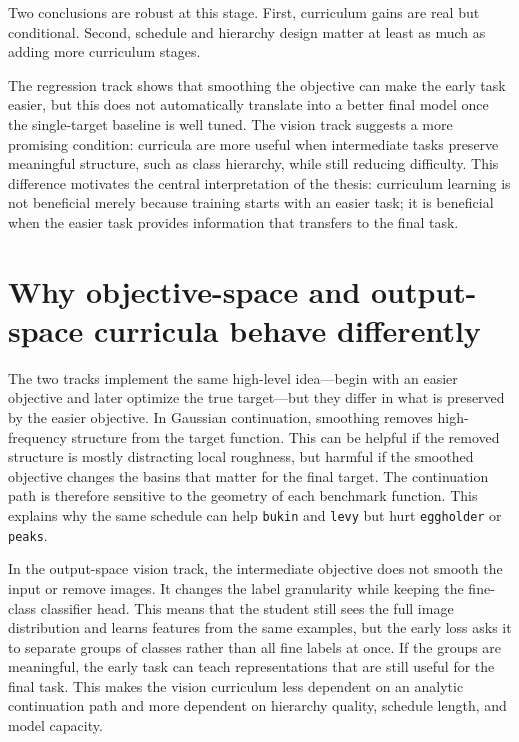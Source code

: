 \documentclass[english,master,a4paper,oneside]{ppfcmthesis}
\begin{document}
Two conclusions are robust at this stage. First, curriculum gains are real but
conditional. Second, schedule and hierarchy design matter at least as much as
adding more curriculum stages.

The regression track shows that smoothing the objective can make the early task
easier, but this does not automatically translate into a better final model once
the single-target baseline is well tuned. The vision track suggests a more
promising condition: curricula are more useful when intermediate tasks preserve
meaningful structure, such as class hierarchy, while still reducing difficulty.
This difference motivates the central interpretation of the thesis: curriculum
learning is not beneficial merely because training starts with an easier task;
it is beneficial when the easier task provides information that transfers to the
final task.

\section{Why objective-space and output-space curricula behave differently}

The two tracks implement the same high-level idea---begin with an easier
objective and later optimize the true target---but they differ in what is
preserved by the easier objective. In Gaussian continuation, smoothing removes
high-frequency structure from the target function. This can be helpful if the
removed structure is mostly distracting local roughness, but harmful if the
smoothed objective changes the basins that matter for the final target. The
continuation path is therefore sensitive to the geometry of each benchmark
function. This explains why the same schedule can help \texttt{bukin} and
\texttt{levy} but hurt \texttt{eggholder} or \texttt{peaks}.

In the output-space vision track, the intermediate objective does not smooth the
input or remove images. It changes the label granularity while keeping the
fine-class classifier head. This means that the student still sees the full
image distribution and learns features from the same examples, but the early
loss asks it to separate groups of classes rather than all fine labels at once.
If the groups are meaningful, the early task can teach representations that are
still useful for the final task. This makes the vision curriculum less dependent
on an analytic continuation path and more dependent on hierarchy quality,
schedule length, and model capacity.
\end{document}
